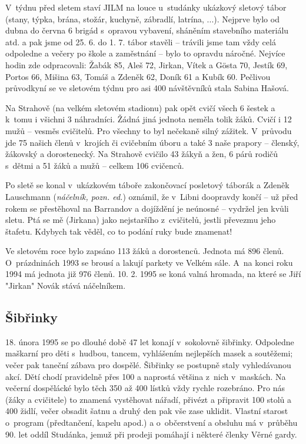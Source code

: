 \documentclass[a5paper, 12pt, twoside]{article}
\begin{document}
V~týdnu před sletem staví JILM na louce u~studánky ukázkový sletový
tábor (stany, týpka, brána, stožár, kuchyně, zábradlí, latrína, ...).
Nejprve bylo od dubna do června 6 brigád s~opravou vybavení, sháněním
stavebního materiálu atd. a pak jsme od 25. 6. do 1. 7. tábor stavěli --
trávili jsme tam vždy celá odpoledne a večery po škole a zaměstnání --
bylo to opravdu náročné. Nejvíce hodin zde odpracovali: Žabák 85, Aleš
72, Jirkan, Vítek a Gösta 70, Jestík 69, Portos 66, Mišina 63, Tomáš a
Zdeněk 62, Doník 61 a Kubík 60. Pečlivou průvodkyní se ve sletovém týdnu
pro asi 400 návštěvníků stala Sabina Hašová.

Na Strahově (na velkém sletovém stadionu) pak opět cvičí všech 6 šestek
a k~tomu i všichni 3 náhradníci. Žádná jiná jednota neměla tolik žáků.
Cvičí i 12 mužů -- vesměs cvičitelů. Pro všechny to byl nečekaně silný
zážitek. V~průvodu jde 75 našich členů v~krojích či cvičebním úboru a
také 3 naše prapory -- členský, žákovský a dorostenecký. Na Strahově
cvičilo 43 žákyň a žen, 6 párů rodičů s~dětmi a 51 žáků a mužů -- celkem
106 cvičenců.

Po sletě se konal v~ukázkovém táboře zakončovací posletový táborák a
Zdeněk Lauschmann (\textit{náčelník, pozn. ed.}) oznámil, že v~Libni
doopravdy končí -- už před rokem se přestěhoval na Barrandov a dojíždění
je neúnosné -- vydržel jen kvůli sletu. Ptá se mě (Jirkana) jako
nejstaršího z~cvičitelů, jestli převezmu jeho štafetu. Kdybych tak
věděl, co to podání ruky bude znamenat!

Ve sletovém roce bylo zapsáno 113 žáků a dorostenců. Jednota má 896
členů. O~prázdninách 1993 se brousí a lakují parkety ve Velkém sále.
A~na konci roku 1994 má jednota již 976 členů. 10. 2. 1995 se koná valná
hromada, na které se Jiří "Jirkan" Novák stává náčelníkem.

\subsection{Šibřinky}

18. února 1995 se po dlouhé době 47 let konají v~sokolovně šibřinky.
Odpoledne maškarní pro děti s~hudbou, tancem, vyhlášením nejlepších
masek a soutěžemi; večer pak taneční zábava pro dospělé. Šibřinky se
postupně staly vyhledávanou akcí. Dětí chodí pravidelně přes 100 a
naprostá většina z~nich v~maskách. Na večerní dospělácké bylo těch 350
až 400 lístků vždy rychle rozebráno. Pro nás (žáky a cvičitele) to
znamená vystěhovat nářadí, přivézt a připravit 100 stolů a 400 židlí,
večer obsadit šatnu a druhý den pak vše zase uklidit. Vlastní starost
o~program (předtančení, kapelu apod.) a o~občerstvení a obsluhu má
v~průběhu 90. let oddíl Studánka, jemuž při prodeji pomáhají i některé
členky Věrné gardy.
\end{document}
